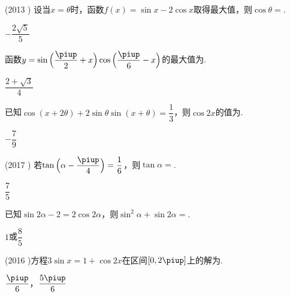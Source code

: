 \begin{exercise}
\begin{answer}
      \end{answer}
    \item%
      (2013 )
      设当$x=\theta$时，函数$f(x)=\sin x-2\cos x$取得最大值，则$\cos\theta=$\tk.
      \begin{answer}
        $-\dfrac{2\sqrt{5}}5$
      \end{answer}
    \item%
      函数$y=\sin{\Bigl(\dfrac{\piup}2+x\Bigr)\cos{\Bigl(\dfrac{\piup}6-x\Bigr)}}$的最大值为\tk.
      \begin{answer}
        $\dfrac{2+\sqrt{3}}4$
      \end{answer}
    \item%
      已知$\cos(x+2\theta)+2\sin\theta\sin(x+\theta)=\dfrac{1}3$，则$\cos{2x}$的值为\tk.
      \begin{answer}
        $-\dfrac{7}9$
      \end{answer}
    \item%
      (2017 )
      若$\tan{\Bigl(\alpha-\dfrac{\piup}4\Bigr)}=\dfrac{1}6$，则$\tan\alpha=$\tk.
      \begin{answer}
        $\dfrac{7}5$
      \end{answer}
    \item%
      已知$\sin{2\alpha}-2=2\cos{2\alpha}$，则$\sin^2\alpha+\sin{2\alpha}=$\tk.
      \begin{answer}
        $1$或$\dfrac{8}5$
      \end{answer}
    \item%
      (2016 )方程$3\sin x=1+\cos{2x}$在区间$[0,2\piup]$上的解为\tk.
      \begin{answer}
        $\dfrac{\piup}6$，$\dfrac{5\piup}6$
      \end{answer}

\end{exercise}
